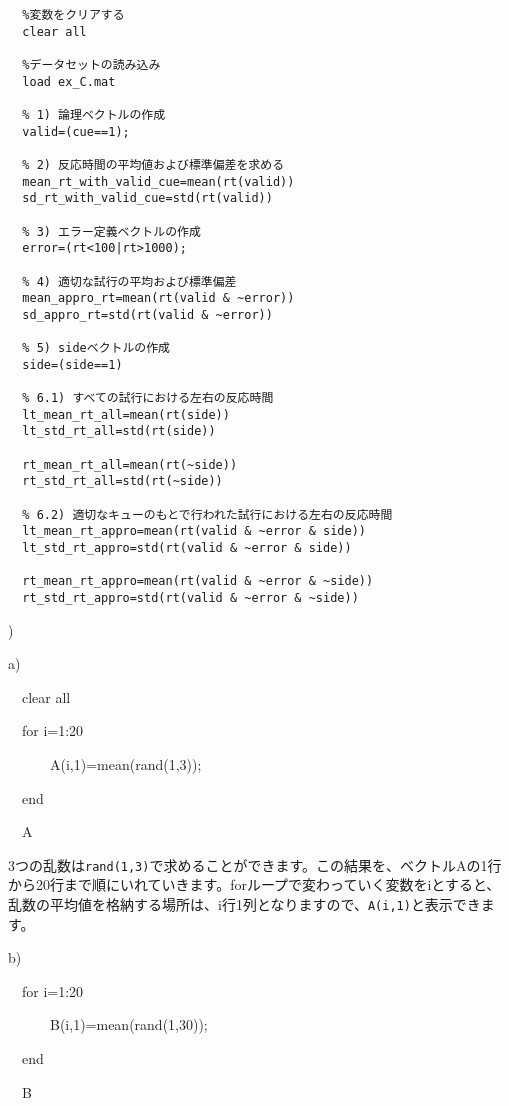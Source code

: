 \documentclass{jsarticle}
\begin{document}
\begin{verbatim}
  %変数をクリアする
  clear all

  %データセットの読み込み
  load ex_C.mat

  % 1) 論理ベクトルの作成
  valid=(cue==1);

  % 2) 反応時間の平均値および標準偏差を求める
  mean_rt_with_valid_cue=mean(rt(valid))
  sd_rt_with_valid_cue=std(rt(valid))

  % 3) エラー定義ベクトルの作成
  error=(rt<100|rt>1000);

  % 4) 適切な試行の平均および標準偏差
  mean_appro_rt=mean(rt(valid & ~error))
  sd_appro_rt=std(rt(valid & ~error))

  % 5) sideベクトルの作成
  side=(side==1)

  % 6.1) すべての試行における左右の反応時間
  lt_mean_rt_all=mean(rt(side))
  lt_std_rt_all=std(rt(side))

  rt_mean_rt_all=mean(rt(~side))
  rt_std_rt_all=std(rt(~side))

  % 6.2) 適切なキューのもとで行われた試行における左右の反応時間
  lt_mean_rt_appro=mean(rt(valid & ~error & side))
  lt_std_rt_appro=std(rt(valid & ~error & side))

  rt_mean_rt_appro=mean(rt(valid & ~error & ~side))
  rt_std_rt_appro=std(rt(valid & ~error & ~side))
\end{verbatim}

\bigskip

)

a) {\tt

\ \ clear all

\ \ for i=1:20

\ \ \ \ \ \ A(i,1)=mean(rand(1,3));

\ \ end

\ \ A
}

\begin{screen}
3つの乱数は{\tt rand(1,3)}で求めることができます。この結果を、ベクトルAの1行から20行まで順にいれていきます。forループで変わっていく変数をiとすると、乱数の平均値を格納する場所は、i行1列となりますので、{\tt A(i,1)}と表示できます。
\end{screen}


\bigskip

b) {\tt 

\ \ for i=1:20

\ \ \ \ \ \ B(i,1)=mean(rand(1,30));

\ \ end

\ \ B
}
\end{document}
